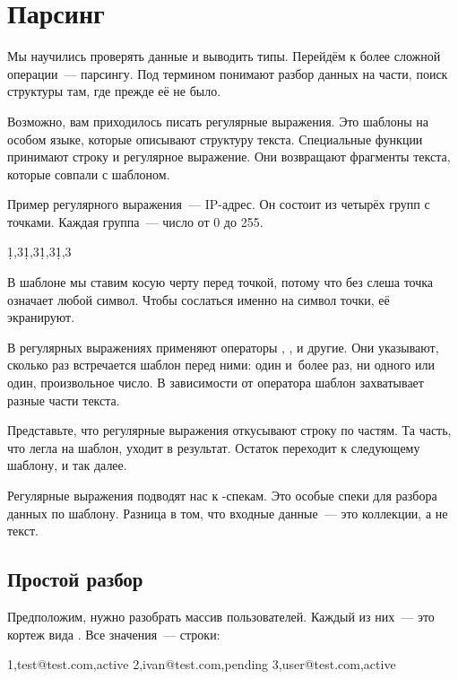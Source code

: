 \section{Парсинг}

Мы научились проверять данные и выводить типы. Перейдём к более сложной
операции~--- парсингу. Под термином понимают разбор данных на части, поиск
структуры там, где прежде её не было.

Возможно, вам приходилось писать регулярные выражения. Это шаблоны на особом
языке, которые описывают структуру текста. Специальные функции принимают строку
и регулярное выражение. Они возвращают фрагменты текста, которые совпали с
шаблоном.

Пример регулярного выражения~--- IP-адрес. Он состоит из четырёх групп с
точками. Каждая группа~--- число от 0 до 255.



\begin{text}
\d{1,3}\.\d{1,3}\.\d{1,3}\.\d{1,3}
\end{text}


В шаблоне мы ставим косую черту перед точкой, потому что без слеша точка
означает любой символ. Чтобы сослаться именно на символ точки, её экранируют.

В регулярных выражениях применяют операторы \code{+}, , \code{*} и
другие. Они указывают, сколько раз встречается шаблон перед ними: один и~более
раз, ни одного или один, произвольное число. В зависимости от оператора шаблон
захватывает разные части текста.

Представьте, что регулярные выражения откусывают строку по частям. Та часть, что
легла на шаблон, уходит в результат. Остаток переходит к следующему шаблону, и
так далее.

Регулярные выражения подводят нас к -спекам. Это особые спеки для
разбора данных по шаблону. Разница в том, что входные данные~--- это коллекции, а не
текст.


\subsection{Простой разбор}

Предположим, нужно разобрать массив пользователей. Каждый из них~--- это кортеж
вида . Все значения~--- строки:


\begin{text}
1,test@test.com,active
2,ivan@test.com,pending
3,user@test.com,active
\end{text}


